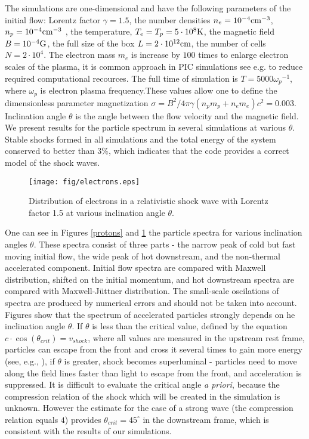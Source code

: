 \documentclass[a4paper]{jpconf}
\begin{document}
The simulations are one-dimensional and have the following parameters of the initial flow: Lorentz factor $\gamma = 1.5$, the number densities $n_e = 10^{-4} \rm{cm}^{-3}$, $n_p = 10^{-4} \rm{cm}^{-3}$ , the temperature, $T_e = T_p = 5\cdot10^8 \rm{K}$, the magnetic field $B = 10^{-4} \rm{G}$, the full size of the box $L = 2\cdot10^{12} \rm{cm}$, the number of cells $N=2\cdot10^4$. The electron mass $m_e$ is increase by $100$ times to enlarge electron scales of  the plasma, it is common approach in PIC simulations see e.g. {\cite{Sironi2011}} to reduce required computational recources. The full time of simulation is $T = 5000 {\omega_p}^{-1}$, where $\omega_p$ is electron plasma frequency.These values allow one to define the dimensionless parameter magnetization $\sigma = B^2/4\pi\gamma (n_p m_p + n_e m_e) c^2 = 0.003$. Inclination angle $\theta$ is the angle between the flow velocity and the magnetic field. We present results for the particle spectrum in several simulations at various $\theta$. Stable shocks formed in all simulations and the total energy of the system conserved to better than $3\%$, which indicates that the code provides a correct model of the shock waves. 


\begin{figure}[h!]
	\centering
	\texttt{[image: fig/electrons.eps]} 
	\caption{Distribution of electrons in a relativistic shock wave with Lorentz factor 1.5 at various inclination angle $\theta$.}
	\label{electrons}
\end{figure}

One can see in Figures \ref{protons} and \ref{electrons} the particle spectra for various inclination angles $\theta$. These spectra consist of three parts - the narrow peak of cold but fast moving initial flow, the wide peak of hot downstream, and the non-thermal accelerated component. Initial flow spectra are compared with Maxwell distribution, shifted on the initial momentum, and hot downstream spectra are compared with Maxwell-J{\"u}ttner distribution.  The small-scale oscilations of spectra are produced by numerical errors and should not be taken into account. Figures show that the spectrum of accelerated particles strongly depends on he inclination angle $\theta$. If $\theta$ is less than the critical value, defined by the equation $c\cdot \cos(\theta_{crit})=v_{shock}$, where all values are measured in the upstream rest frame, particles can escape from the front and cross it several times to gain more energy (see, e.g., \cite{Pelletier2017}), if $\theta$ is greater, shock becomes superluminal - particles need to move along the field lines faster than light to escape from the front, and acceleration is suppressed. It is difficult to evaluate the critical angle \textit{a priori}, because the compression relation of the shock which will be created in the simulation is unknown. However the estimate for the case of a strong wave (the compression relation equals $4$) provides $\theta_{crit}=45^{\circ}$ in the downstream frame, which is consistent with the results of our simulations.
\end{document}
